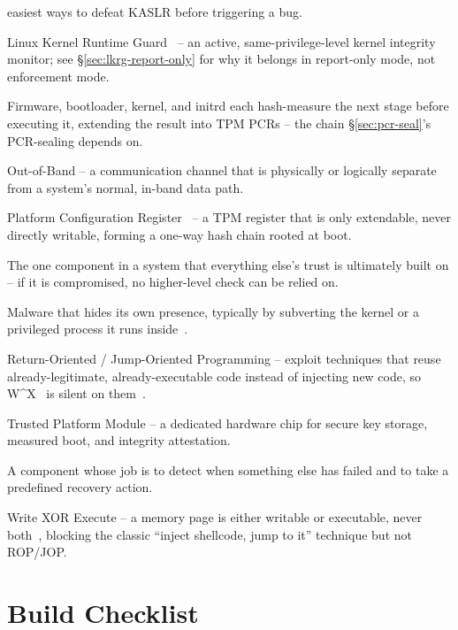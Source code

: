 \documentclass[11pt,a4paper]{article}
\begin{document}
\begin{description}[leftmargin=3.2cm, style=nextline, itemsep=0.35em]
    easiest ways to defeat KASLR before triggering a bug.
  \item[LKRG] Linux Kernel Runtime Guard~\cite{lkrg} -- an active,
    same-privilege-level kernel integrity monitor; see
    \S\ref{sec:lkrg-report-only} for why it belongs in report-only
    mode, not enforcement mode.
  \item[Measured Boot] Firmware, bootloader, kernel, and initrd each
    hash-measure the next stage before executing it, extending the
    result into TPM PCRs -- the chain \S\ref{sec:pcr-seal}'s
    PCR-sealing depends on.
  \item[OOB] Out-of-Band -- a communication channel that is physically
    or logically separate from a system's normal, in-band data path.
  \item[PCR] Platform Configuration Register~\cite{tcgtpm2,tcgpcclient}
    -- a TPM register that is only extendable, never directly
    writable, forming a one-way hash chain rooted at boot.
  \item[Root of Trust] The one component in a system that everything
    else's trust is ultimately built on -- if it is compromised, no
    higher-level check can be relied on.
  \item[Rootkit] Malware that hides its own presence, typically by
    subverting the kernel or a privileged process it runs
    inside~\cite{hogland2005}.
  \item[ROP/JOP] Return-Oriented / Jump-Oriented Programming -- exploit
    techniques that reuse already-legitimate, already-executable code
    instead of injecting new code, so
    W\textasciicircum X~\cite{deraadt2005} is silent on
    them~\cite{shacham2007,bletsch2011}.
  \item[TPM] Trusted Platform Module -- a dedicated hardware chip for
    secure key storage, measured boot, and integrity attestation.
  \item[Watchdog] A component whose job is to detect when something else
    has failed and to take a predefined recovery action.
  \item[W\textasciicircum X] Write XOR Execute -- a memory page is
    either writable or executable, never
    both~\cite{deraadt2005}, blocking the classic ``inject
    shellcode, jump to it'' technique but not ROP/JOP.
\end{description}

\section{Build Checklist}
\label{sec:checklist}
\end{document}
